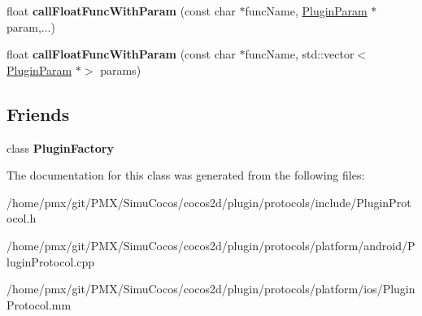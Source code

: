 \begin{DoxyCompactItemize}
\item 
\mbox{\label{classcocos2d_1_1plugin_1_1PluginProtocol_a38d7983dd469098f2f691cfc572c6268}} 
float {\bfseries call\+Float\+Func\+With\+Param} (const char $\ast$func\+Name, \hyperlink{classcocos2d_1_1plugin_1_1PluginParam}{Plugin\+Param} $\ast$param,...)
\item 
\mbox{\label{classcocos2d_1_1plugin_1_1PluginProtocol_abe74f22c43459cad12234f6bf70a3cfd}} 
float {\bfseries call\+Float\+Func\+With\+Param} (const char $\ast$func\+Name, std\+::vector$<$ \hyperlink{classcocos2d_1_1plugin_1_1PluginParam}{Plugin\+Param} $\ast$$>$ params)
\end{DoxyCompactItemize}
\subsection*{Friends}
\begin{DoxyCompactItemize}
\item 
\mbox{\label{classcocos2d_1_1plugin_1_1PluginProtocol_ab6329b1766c6f72a57a753928cd2df00}} 
class {\bfseries Plugin\+Factory}
\end{DoxyCompactItemize}


The documentation for this class was generated from the following files\+:\begin{DoxyCompactItemize}
\item 
/home/pmx/git/\+P\+M\+X/\+Simu\+Cocos/cocos2d/plugin/protocols/include/Plugin\+Protocol.\+h\item 
/home/pmx/git/\+P\+M\+X/\+Simu\+Cocos/cocos2d/plugin/protocols/platform/android/Plugin\+Protocol.\+cpp\item 
/home/pmx/git/\+P\+M\+X/\+Simu\+Cocos/cocos2d/plugin/protocols/platform/ios/Plugin\+Protocol.\+mm\end{DoxyCompactItemize}
